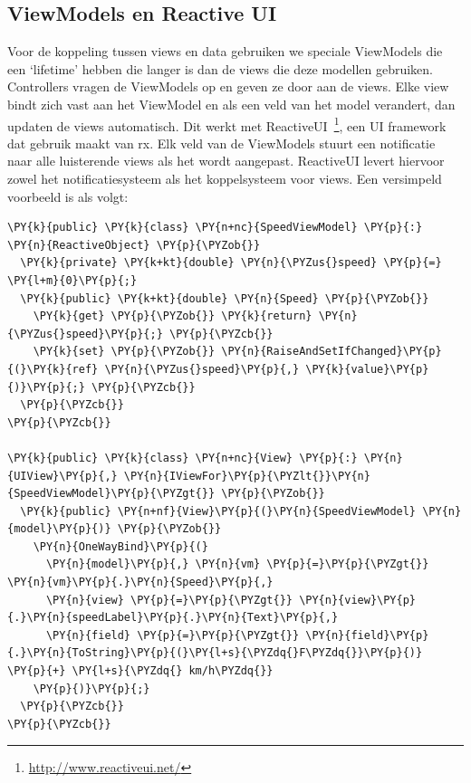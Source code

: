 \subsection{ViewModels en Reactive UI} 
\label{sec:vm-reactive-ui}

Voor de koppeling tussen views en data gebruiken we speciale ViewModels die een `lifetime' hebben die langer is dan de views die deze modellen gebruiken. Controllers vragen de ViewModels op en geven ze door aan de views. Elke view bindt zich vast aan het ViewModel en als een veld van het model verandert, dan updaten de views automatisch. Dit werkt met ReactiveUI~\footnote{\url{http://www.reactiveui.net/}}, een UI framework dat gebruik maakt van \ac{rx}. Elk veld van de ViewModels stuurt een notificatie naar alle luisterende views als het wordt aangepast. ReactiveUI levert hiervoor zowel het notificatiesysteem als het koppelsysteem voor views. Een versimpeld voorbeeld is als volgt:




\begin{Verbatim}[commandchars=\\\{\}]
\PY{k}{public} \PY{k}{class} \PY{n+nc}{SpeedViewModel} \PY{p}{:} \PY{n}{ReactiveObject} \PY{p}{\PYZob{}}
  \PY{k}{private} \PY{k+kt}{double} \PY{n}{\PYZus{}speed} \PY{p}{=} \PY{l+m}{0}\PY{p}{;}
  \PY{k}{public} \PY{k+kt}{double} \PY{n}{Speed} \PY{p}{\PYZob{}}
    \PY{k}{get} \PY{p}{\PYZob{}} \PY{k}{return} \PY{n}{\PYZus{}speed}\PY{p}{;} \PY{p}{\PYZcb{}}
    \PY{k}{set} \PY{p}{\PYZob{}} \PY{n}{RaiseAndSetIfChanged}\PY{p}{(}\PY{k}{ref} \PY{n}{\PYZus{}speed}\PY{p}{,} \PY{k}{value}\PY{p}{)}\PY{p}{;} \PY{p}{\PYZcb{}}
  \PY{p}{\PYZcb{}}
\PY{p}{\PYZcb{}}

\PY{k}{public} \PY{k}{class} \PY{n+nc}{View} \PY{p}{:} \PY{n}{UIView}\PY{p}{,} \PY{n}{IViewFor}\PY{p}{\PYZlt{}}\PY{n}{SpeedViewModel}\PY{p}{\PYZgt{}} \PY{p}{\PYZob{}}
  \PY{k}{public} \PY{n+nf}{View}\PY{p}{(}\PY{n}{SpeedViewModel} \PY{n}{model}\PY{p}{)} \PY{p}{\PYZob{}}
    \PY{n}{OneWayBind}\PY{p}{(}
      \PY{n}{model}\PY{p}{,} \PY{n}{vm} \PY{p}{=}\PY{p}{\PYZgt{}} \PY{n}{vm}\PY{p}{.}\PY{n}{Speed}\PY{p}{,}
      \PY{n}{view} \PY{p}{=}\PY{p}{\PYZgt{}} \PY{n}{view}\PY{p}{.}\PY{n}{speedLabel}\PY{p}{.}\PY{n}{Text}\PY{p}{,}
      \PY{n}{field} \PY{p}{=}\PY{p}{\PYZgt{}} \PY{n}{field}\PY{p}{.}\PY{n}{ToString}\PY{p}{(}\PY{l+s}{\PYZdq{}F\PYZdq{}}\PY{p}{)} \PY{p}{+} \PY{l+s}{\PYZdq{} km/h\PYZdq{}}
    \PY{p}{)}\PY{p}{;}
  \PY{p}{\PYZcb{}}
\PY{p}{\PYZcb{}}
\end{Verbatim}


